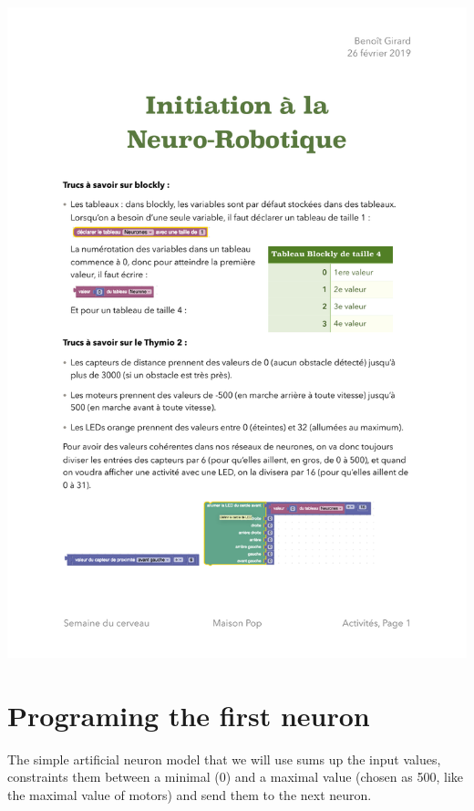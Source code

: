 \documentclass[12pt]{article}
\begin{document}
\begin{center}
\includegraphics[width=\textwidth]{../Normalisation.pdf}
\end{center}

\section{Programing the first neuron}

The simple artificial neuron model that we will use sums up the input values, constraints them between a minimal (0) and a maximal value (chosen as 500, like the maximal value of motors) and send them to the next neuron.
\end{document}

